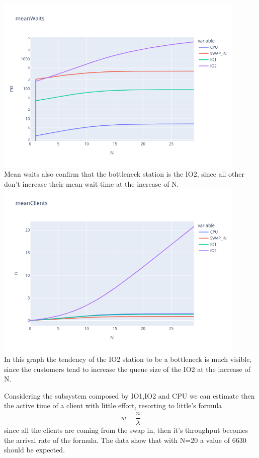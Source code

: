 \documentclass[12pt,a4paper]{article}
\begin{document}
\\
\includegraphics[width=0.9\textwidth]{Images/meanWaits.png}
\\
Mean waits also confirm that the bottleneck station is the IO2, since all other don't increase their mean wait time at the increase of N.
\\
\includegraphics[width=0.9\textwidth]{Images/meanClients.png}
\\
In this graph the tendency of the IO2 station to be a bottleneck is much visible, since the customers tend to increase the queue size of the IO2 at the increase of N.

Considering the subsystem composed by IO1,IO2 and CPU we can estimate then the active time of a client with little effort, resorting to little's formula
$$
    \bar{w}= \frac{\bar{n}}{\lambda}
$$
since all the clients are coming from the swap in, then it's throughput becomes the arrival rate of the formula. The data show that with N=20 a value of 6630 should be expected.
\end{document}
